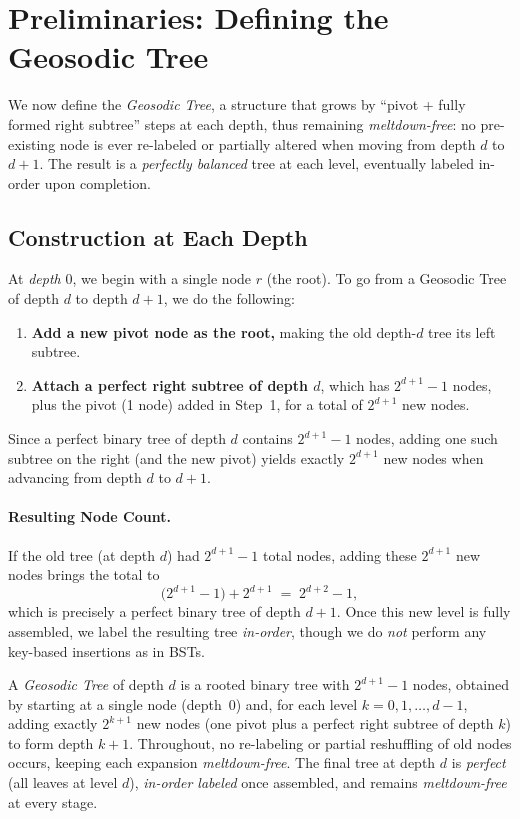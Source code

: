 \section{Preliminaries: Defining the Geosodic Tree}
\label{sec:prelim}

We now define the \emph{Geosodic Tree}, a structure that grows by 
``pivot + fully formed right subtree'' steps at each depth, 
thus remaining \emph{meltdown-free}: 
no pre-existing node is ever re-labeled or partially altered when moving 
from depth $d$ to $d+1$. The result is a \emph{perfectly balanced} tree 
at each level, eventually labeled in-order upon completion.

\subsection{Construction at Each Depth}
\label{subsec:construction}

At \emph{depth} $0$, we begin with a single node $r$ (the root). To go from a Geosodic Tree
of depth $d$ to depth $d+1$, we do the following:

\begin{enumerate}
  \item \textbf{Add a new pivot node as the root,} making the old depth-$d$ tree its left subtree.
  \item \textbf{Attach a perfect right subtree of depth $d$}, which has $2^{d+1}-1$ nodes,
        plus the pivot (1 node) added in Step~1, for a total of $2^{d+1}$ new nodes.
\end{enumerate}

Since a perfect binary tree of depth $d$ contains $2^{d+1}-1$ nodes, 
adding one such subtree on the right (and the new pivot) yields exactly $2^{d+1}$ new nodes 
when advancing from depth $d$ to $d+1$. 

\paragraph{Resulting Node Count.}
If the old tree (at depth $d$) had $2^{d+1}-1$ total nodes, adding these $2^{d+1}$ new nodes 
brings the total to
\[
  \bigl(2^{d+1}-1\bigr) + 2^{d+1} 
  \;=\;
  2^{d+2}-1,
\]
which is precisely a perfect binary tree of depth $d+1$. Once this new level is fully assembled,
we label the resulting tree \emph{in-order}, though we do \emph{not} perform any 
key-based insertions as in BSTs.



\begin{definition}
\label{def:geosodic-tree}
A \emph{Geosodic Tree} of depth $d$ is a rooted binary tree with $2^{d+1}-1$ nodes,
obtained by starting at a single node (depth~0) and, for each level $k=0,1,\dots,d-1$, 
adding exactly $2^{k+1}$ new nodes (one pivot plus a perfect right subtree of depth $k$) 
to form depth $k+1$. Throughout, no re-labeling or partial reshuffling of old nodes occurs,
keeping each expansion \emph{meltdown-free}. The final tree at depth $d$ is \emph{perfect} 
(all leaves at level $d$), \emph{in-order labeled} once assembled, and remains 
\emph{meltdown-free} at every stage.
\end{definition}

